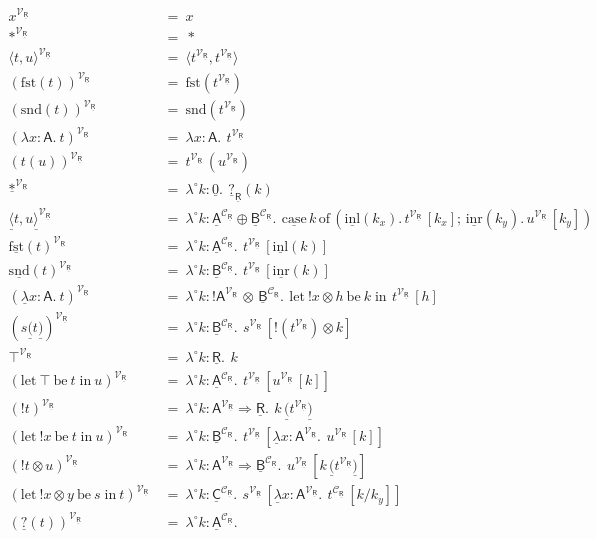 \documentclass{LMCS}
\newcommand{\comptype}[1]{\underline{#1}}
\newcommand{\VA}{\mathsf{A}}
\newcommand{\CA}{\comptype{\mathsf{A}}}
\newcommand{\CB}{\comptype{\mathsf{B}}}
\newcommand{\CC}{\comptype{\mathsf{C}}}
\newcommand{\CR}{\comptype{\mathsf{R}}}
\newcommand{\Cfun}{\Rightarrow}
\newcommand{\Ccopower}[2]{! #1 \, {\otimes} \, #2}
\newcommand{\Czero}{\comptype{0}}
\newcommand{\Cplus}{\oplus}
\newcommand{\In}[2]{#1 \colon  \! #2}
\newcommand{\Vstar}{{*}}
\newcommand{\Vpair}[2]{\langle #1 , #2 \rangle}
\newcommand{\Vfst}[1]{\mathrm{fst}(#1)}
\newcommand{\Vsnd}[1]{\mathrm{snd}(#1)}
\newcommand{\Vlam}[3]{\lambda \In{#1}{#2}.\: #3}
\newcommand{\Vappl}[2]{#1(#2)}
\newcommand{\compop}[1]{\underline{#1}}
\newcommand{\Cstar}{\compop{*}}
\newcommand{\Cpair}[2]{\compop{\langle} #1 , #2 \compop{\rangle}}
\newcommand{\Cfst}[1]{\compop{\mathrm{fst}}(#1)}
\newcommand{\Csnd}[1]{\compop{\mathrm{snd}}(#1)}
\newcommand{\Clam}[3]{\compop{\lambda} \In{#1}{#2}.\: #3}
\newcommand{\Cappl}[2]{#1\compop{(}#2\compop{)}}
\newcommand{\bang}[1]{{! #1}}
\newcommand{\Itop}{\top}
\newcommand{\Ilet}[2]{\mathrm{let}\: {\Itop}\:\mathrm{be}\:{#1} \;\mathrm{in}\: #2}
\newcommand{\banglet}[3]{\mathrm{let}\: {\bang #1}\:\mathrm{be}\:{#2} \;\mathrm{in}\: #3}
\newcommand{\llambda}{\lambda^{\!\circ\!}}
\newcommand{\llam}[3]{\llambda \In{#1}{#2}.\: #3}
\newcommand{\lappl}[2]{#1[#2]}
\newcommand{\copowerterm}[2]{{\bang{#1}}\! \otimes \! #2}
\newcommand{\copowerlet}[4]{\mathrm{let}\: {\copowerterm{#1}{#2}}\:\mathrm{be}\:{#3} \;\mathrm{in}\: #4}
\newcommand{\Cimage}[1]{\compop{?}(#1)}
\newcommand{\Cimagetype}[2]{\compop{?}_{#1}(#2)}
\newcommand{\Cinl}[1]{\compop{\mathrm{inl}}(#1)}
\newcommand{\Cinr}[1]{\compop{\mathrm{inr}}(#1)}
\newcommand{\Ccase}[5]{\compop{\mathrm{case}} \, #1 \,\mathrm{of}\,( \Cinl{#2}. \, #3 ; \, \Cinr{#4}. \, #5)}
\newcommand{\CpsVT}[1]{#1^{\mathcal{V}_{\CR}}}
\newcommand{\CpsCT}[1]{#1^{\mathcal{C}_{\CR}}}
\begin{document}
\begin{figure}[t]
\begin{align*}
\CpsVT{x}  & \: = \:  x 
\\
\CpsVT{\Vstar}  & \: = \:  \Vstar 
\\
\CpsVT{\Vpair{t}{u}}  & \: = \:  \Vpair{\CpsVT{t}}{\CpsVT{t}}
\\
\CpsVT{(\Vfst{t})}  & \: = \:  \Vfst{\CpsVT{t}}
\\
\CpsVT{(\Vsnd{t})}  & \: = \:  \Vsnd{\CpsVT{t}}
\\
\CpsVT{(\Vlam{x}{\VA}{t})} & \: = \:  \Vlam{x}{\VA}{\,\CpsVT{t}}
\\
\CpsVT{(\Vappl{t}{u})}  & \: = \:  \Vappl{\CpsVT{t}\,}{\CpsVT{u}}
\\
\CpsVT{\Cstar}  & \: = \:  \llam{k}{\Czero}{\,\Cimagetype{\CR}{k}}
\\
\CpsVT{\Cpair{t}{u}}  & \: = \:  \llam{k}{\CpsCT{\CA} \Cplus \CpsCT{\CB}}
   {\,\Ccase{k}{k_x}{\lappl{\CpsVT{t}\,}{k_x}}{k_y}{\lappl{\CpsVT{u}\,}{k_y}}} 
\\
\CpsVT{\Cfst{t}}  & \: = \:  \llam{k}{\CpsCT{\CA}}
   {\,\lappl{\CpsVT{t}\,}{\Cinl{k}}}
\\
\CpsVT{\Csnd{t}}  & \: = \:  \llam{k}{\CpsCT{\CB}}
   {\,\lappl{\CpsVT{t}\,}{\Cinr{k}}}
\\
\CpsVT{(\Clam{x}{\VA}{t})}  & \: = \:  \llam{k}{\Ccopower{\CpsVT{\VA}}{\CpsCT{\CB}}}
   {\,\copowerlet{x}{h}{k}{\,\lappl{\CpsVT{t}\,}{h}}}
\\
\CpsVT{(\Cappl{s}{t})}  & \: = \:  \llam{k}{\CpsCT{\CB}}
   {\,\lappl{\CpsVT{s}\,}{\copowerterm{(\CpsVT{t})}{k}}}
\\
\CpsVT{\Itop}  & \: = \:  \llam{k}{\CR}{\, k}
\\
\CpsVT{(\Ilet{t}{u})}  & \: = \:  \llam{k}{\CpsCT{\CA}}{\, 
   \lappl{\CpsVT{t}\,}{\lappl{\CpsVT{u}\,}{k}}}
\\
\CpsVT{(\bang{t})}  & \: = \:  \llam{k}{\CpsVT{\VA} \Cfun \CR}
   {\,\Cappl{k\,}{\CpsVT{t}}}
\\
\CpsVT{(\banglet{x}{t}{u})}  & \: = \:  \llam{k}{\CpsCT{\CB}}
   {\,\lappl{\CpsVT{t}\,}{\Clam{x}{\CpsVT{\VA}}{\,\lappl{\CpsVT{u}\,}{k}}}}
\\
\CpsVT{(\copowerterm{t}{u})}  & \: = \:   \llam{k}{\CpsVT{\VA} \Cfun \CpsCT{\CB}}
   {\,\lappl{\CpsVT{u}\,}{\Cappl{k\,}{\CpsVT{t}}}} 
\\
\CpsVT{(\copowerlet{x}{y}{s}{t})}  & \: = \:  \llam{k}{\CpsCT{\CC}}
   {\,\lappl{\CpsVT{s}\,}{\Clam{x}{\CpsVT{\VA}}{\,\CpsCT{t}\,[k/k_y]}}} 
\\
\CpsVT{(\Cimage{t})}  & \: = \:  \llam{k}{\CpsCT{\CA}}

\end{align*}
\end{figure}
\end{document}
